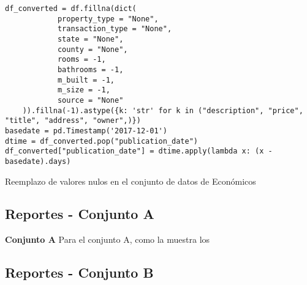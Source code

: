 \begin{listing}[H]
    \begin{verbatim}
df_converted = df.fillna(dict(
            property_type = "None",
            transaction_type = "None",
            state = "None",
            county = "None",
            rooms = -1,
            bathrooms = -1,
            m_built = -1,
            m_size = -1,
            source = "None"
    )).fillna(-1).astype({k: 'str' for k in ("description", "price", "title", "address", "owner",)})
basedate = pd.Timestamp('2017-12-01')
dtime = df_converted.pop("publication_date")
df_converted["publication_date"] = dtime.apply(lambda x: (x - basedate).days)
    \end{verbatim}
\caption{Reemplazo de valores nulos en el conjunto de datos de Económicos}
\label{codigo-replace-nan}
\end{listing}

\newpage
\subsection{Reportes - Conjunto A}
\textbf{Conjunto A}
\label{ds-conjunto-a}
Para el conjunto A, como la  muestra los 



%




%


%

%

\newpage
\subsection{Reportes - Conjunto B}
\label{ds-conjunto-b}















